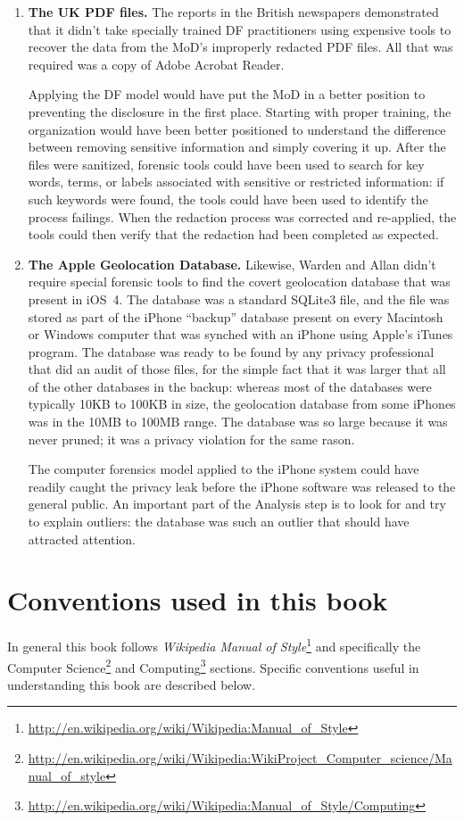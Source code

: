 \begin{enumerate}
\item \textbf{The UK PDF files.} The reports in the British
  newspapers demonstrated  that it didn't take specially trained DF
  practitioners using expensive tools to recover the data from the
  MoD's improperly redacted PDF files. All that was required was a
  copy of Adobe Acrobat Reader. 

  Applying the DF model would have put the MoD in a better position to
  preventing the disclosure in the first place. Starting with proper
  training, the organization would have been better positioned to
  understand the difference between removing sensitive information and
  simply covering it up. After the files were sanitized, forensic tools
  could have been used to search for key words, terms,
  or labels associated with sensitive or restricted information: if
  such keywords were found, the tools could have been used to identify
  the process failings. When the redaction process was corrected and
  re-applied, the tools could then verify that the redaction had been
  completed as expected.

\item \textbf{The Apple Geolocation Database.} Likewise, Warden and Allan didn't
  require special forensic tools to find the covert geolocation
  database that was present in iOS~4. The database was a standard SQLite3
  file, and the file was stored as part of the iPhone ``backup''
  database present on every Macintosh or Windows computer that was
  synched with an iPhone using Apple's iTunes program. The database
  was ready to be found by any privacy professional that did an audit
  of those files, for the simple fact that it was larger that all of
  the other databases in the backup: whereas most of the databases were typically
  10KB to 100KB in size, the geolocation database from some iPhones was
  in the 10MB to 100MB range. The database was so large because it was
  never pruned; it was a privacy violation for the same rason.

  The computer forensics model applied to the iPhone system could have
  readily caught the privacy leak before the iPhone software was
  released to the general public. An important part of the Analysis
  step is to look for and try to explain outliers: the database
  was such an outlier that should have attracted attention. 
\end{enumerate}


\section{Conventions used in this book}
In general this book follows \emph{Wikipedia Manual of
  Style}\footnote{\url{http://en.wikipedia.org/wiki/Wikipedia:Manual_of_Style}}
and specifically the Computer
Science\footnote{\url{http://en.wikipedia.org/wiki/Wikipedia:WikiProject_Computer_science/Manual_of_style}}
  and
  Computing\footnote{\url{http://en.wikipedia.org/wiki/Wikipedia:Manual_of_Style/Computing}}
  sections. Specific conventions useful in understanding this book are
  described below.

